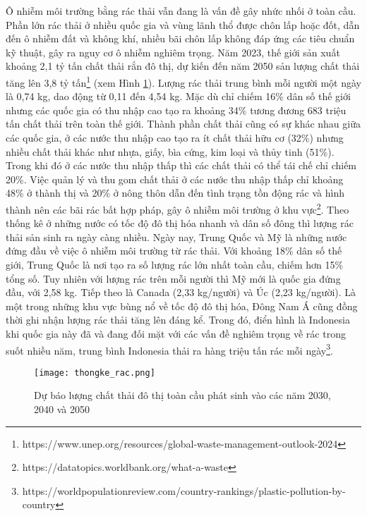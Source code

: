 \documentclass[../the.tex]{subfiles}
\begin{document}
{\fontsize{13}{12} \selectfont

Ô nhiễm môi trường bằng rác thải vẫn đang là vấn đề gây nhức nhối ở toàn cầu.
Phần lớn rác thải ở nhiều quốc gia và vùng lãnh thổ được chôn lấp hoặc đốt, dẫn đến ô nhiễm đất và không khí, nhiều bãi chôn lấp không đáp ứng các tiêu chuẩn kỹ thuật, gây ra nguy cơ ô nhiễm nghiêm trọng.
Năm 2023, thế giới sản xuất khoảng 2,1 tỷ tấn chất thải rắn đô thị, dự kiến đến năm 2050 sản lượng chất thải tăng lên 3,8 tỷ tấn\footnote[1]{https://www.unep.org/resources/global-waste-management-outlook-2024} (xem Hình \ref{fig:thongke_rac}).
Lượng rác thải trung bình mỗi người một ngày là 0,74 kg, dao động từ 0,11 đến 4,54 kg. Mặc dù chỉ chiếm 16\% dân số thế giới nhưng các quốc gia có thu nhập cao tạo ra khoảng 34\% tương đương 683 triệu tấn chất thải trên toàn thế giới.
Thành phần chất thải cũng có sự khác nhau giữa các quốc gia, ở các nước thu nhập cao tạo ra ít chất thải hữu cơ (32\%) nhưng nhiều chất thải khác như nhựa, giấy, bìa cứng, kim loại và thủy tinh (51\%). Trong khi đó ở các nước thu nhập thấp thì các chất thải có thể tái chế chỉ chiếm 20\%.
Việc quản lý và thu gom chất thải ở các nước thu nhập thấp chỉ khoảng 48\% ở thành thị và 20\% ở nông thôn dẫn đến tình trạng tồn động rác và hình thành nên các bãi rác bất hợp pháp, gây ô nhiễm môi trường ở khu vực\footnote[2]{https://datatopics.worldbank.org/what-a-waste}. 
Theo thống kê ở những nước có tốc độ đô thị hóa nhanh và dân số đông thì lượng rác thải sản sinh ra ngày càng nhiều. Ngày nay, Trung Quốc và Mỹ là những nước đứng đầu về việc ô nhiễm môi trường từ rác thải.
Với khoảng 18\% dân số thế giới, Trung Quốc là nơi tạo ra số lượng rác lớn nhất toàn cầu, chiếm hơn 15\% tổng số. Tuy nhiên với lượng rác trên mỗi người thì Mỹ mới là quốc gia đứng đầu, với 2,58 kg. Tiếp theo là Canada (2,33 kg/người) và Úc (2,23 kg/người).
Là một trong những khu vực bùng nổ về tốc độ đô thị hóa, Đông Nam Á cũng đồng thời ghi nhận lượng rác thải tăng lên đáng kể.
Trong đó, điển hình là Indonesia khi quốc gia này đã và đang đối mặt với các vấn đề nghiêm trọng về rác trong suốt nhiều năm, trung bình Indonesia thải ra hàng triệu tấn rác mỗi ngày\footnote[3]{https://worldpopulationreview.com/country-rankings/plastic-pollution-by-country}.

}

\begin{figure}[H]
	\centering
	\texttt{[image: thongke\_rac.png]}
	\caption{Dự báo lượng chất thải đô thị toàn cầu phát sinh vào các năm 2030, 2040 và 2050}
	\label{fig:thongke_rac}
\end{figure}
\end{document}
